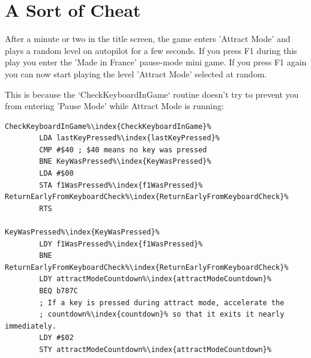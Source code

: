 \section{A Sort of Cheat}

After a minute or two in the title screen, the game enters 'Attract Mode' and
plays a random level on autopilot for a few seconds. If you press F1 during
this play you enter the 'Made in France' pause-mode mini game. If you press F1
again you can now start playing the level 'Attract Mode' selected at random.

This is because the `CheckKeyboardInGame` routine doesn't try to prevent you
from entering 'Pause Mode' while Attract Mode is running:

\begin{lstlisting}[caption=Fixing the reappearing enemy bug,escapechar=\%]
CheckKeyboardInGame%\index{CheckKeyboardInGame}%
        LDA lastKeyPressed%\index{lastKeyPressed}%
        CMP #$40 ; $40 means no key was pressed
        BNE KeyWasPressed%\index{KeyWasPressed}%
        LDA #$00
        STA f1WasPressed%\index{f1WasPressed}%
ReturnEarlyFromKeyboardCheck%\index{ReturnEarlyFromKeyboardCheck}%   
        RTS

KeyWasPressed%\index{KeyWasPressed}%   
        LDY f1WasPressed%\index{f1WasPressed}%
        BNE ReturnEarlyFromKeyboardCheck%\index{ReturnEarlyFromKeyboardCheck}%
        LDY attractModeCountdown%\index{attractModeCountdown}%
        BEQ b787C
        ; If a key is pressed during attract mode, accelerate the
        ; countdown%\index{countdown}% so that it exits it nearly immediately.
        LDY #$02
        STY attractModeCountdown%\index{attractModeCountdown}%
\end{lstlisting}

